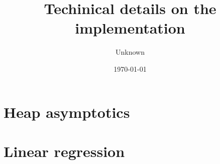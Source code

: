 \documentclass[12pt,titlepage]{article}
\title{Techinical details on the implementation}
\author{Unknown}
\affil{GRABEZH\textsuperscript{\texttrademark}}
\date{\today}
\theoremstyle{remark}
\theoremstyle{plain}
\theoremstyle{plain}
\begin{document}
\maketitle

\tableofcontents
\newpage

\section{Heap asymptotics}


\section{Linear regression} \label{sec:linear_regression}

\end{document}
